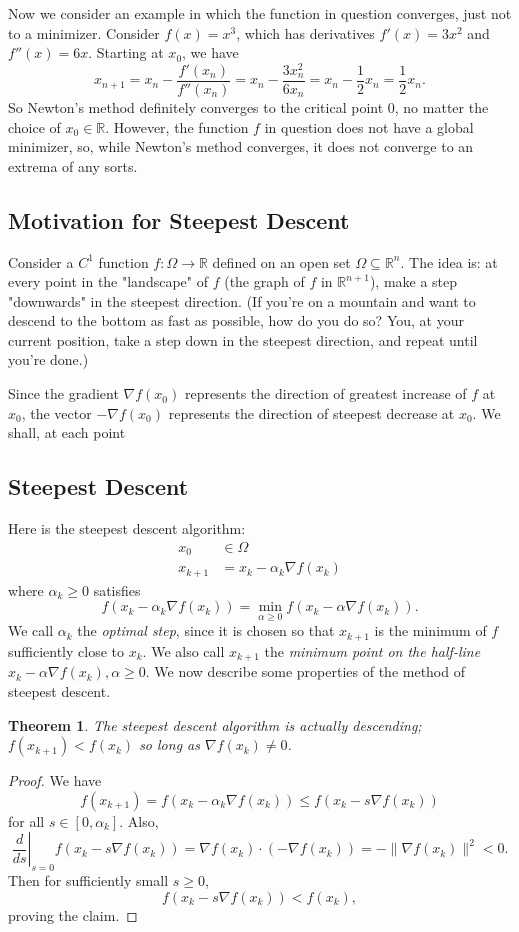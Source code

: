\documentclass[11pt]{article}
\newcommand{\R}{\mathbb{R}}
\newtheorem{theorem}{Theorem}[subsection]
\begin{document}
Now we consider an example in which the function in question converges, just not to a minimizer. Consider $f(x) = x^3$, which has derivatives $f'(x) = 3x^2$ and $f''(x) = 6x$. Starting at $x_0$, we have
\[
x_{n+1} = x_n - \frac{f'(x_n)}{f''(x_n)} = x_n - \frac{3x_n^2}{6x_n} = x_n - \frac{1}{2}x_n = \frac{1}{2}x_n.
\]
So Newton's method definitely converges to the critical point $0$, no matter the choice of $x_0 \in \R$. However, the function $f$ in question does not have a global minimizer, so, while Newton's method converges, it does not converge to an extrema of any sorts.

\subsection{Motivation for Steepest Descent}

Consider a $C^1$ function $f : \Omega \to \R$ defined on an open set $\Omega \subseteq \R^n$. The idea is: at every point in the "landscape" of $f$ (the graph of $f$ in $\R^{n+1}$), make a step "downwards" in the steepest direction. (If you're on a mountain and want to descend to the bottom as fast as possible, how do you do so? You, at your current position, take a step down in the steepest direction, and repeat until you're done.) 

Since the gradient $\nabla f(x_0)$ represents the direction of greatest increase of $f$ at $x_0$, the vector $-\nabla f(x_0)$ represents the direction of steepest decrease at $x_0$. We shall, at each point 

\subsection{Steepest Descent}

Here is the steepest descent algorithm:
\begin{align*}
x_0 &\in \Omega \\
x_{k+1} &= x_k - \alpha_k \nabla f(x_k)
\end{align*}
where $\alpha_k \geq 0$ satisfies 
\[
f(x_k - \alpha_k \nabla f(x_k)) = \min_{\alpha \geq 0} f(x_k - \alpha \nabla f(x_k)).
\]
We call $\alpha_k$ the \emph{optimal step}, since it is chosen so that $x_{k+1}$ is the minimum of $f$ sufficiently close to $x_k$. We also call $x_{k+1}$ the \emph{minimum point on the half-line} $x_k - \alpha \nabla f(x_k), \alpha \geq 0$. We now describe some properties of the method of steepest descent.

\begin{theorem}
The steepest descent algorithm is actually descending; $f(x_{k+1}) < f(x_k)$ so long as $\nabla f(x_k) \neq 0$.
\end{theorem}
\begin{proof}
We have
\[
f(x_{k+1}) = f(x_k - \alpha_k \nabla f(x_k)) \leq f(x_k - s \nabla f(x_k))
\]
for all $s \in [0, \alpha_k]$. Also,
\[
\left. \frac{d}{ds} \right|_{s=0} f(x_k - s\nabla f(x_k)) = \nabla f(x_k) \cdot (-\nabla f(x_k)) = -\| \nabla f(x_k) \|^2 < 0.
\]
Then for sufficiently small $s \geq 0$,
\[
f(x_k - s\nabla f(x_k)) < f(x_k),
\]
proving the claim.
\end{proof}
\end{document}
